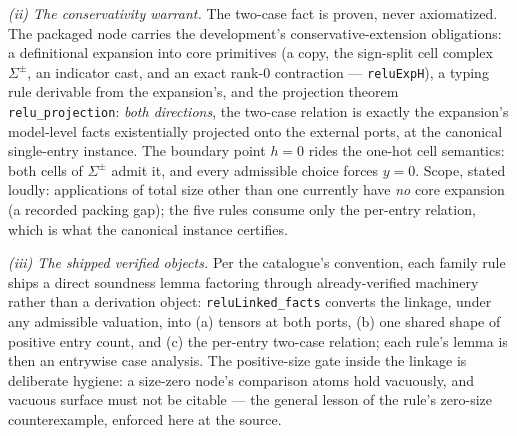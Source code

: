 \begin{brecipe}
\emph{(ii) The conservativity warrant.} The two-case fact is proven,
never axiomatized. The packaged node carries the development's
conservative-extension obligations: a definitional expansion into core
primitives (a copy, the sign-split cell complex $\Sigma^{\pm}$, an
indicator cast, and an exact rank-0 contraction ---
\texttt{reluExpH}), a typing rule derivable from the expansion's, and
the projection theorem \texttt{relu\_projection}: \emph{both
directions}, the two-case relation is exactly the expansion's
model-level facts existentially projected onto the external ports, at
the canonical single-entry instance. The boundary point $h = 0$ rides
the one-hot cell semantics: both cells of $\Sigma^{\pm}$ admit it, and
every admissible choice forces $y = 0$. Scope, stated loudly:
applications of total size other than one currently have \emph{no}
core expansion (a recorded packing gap); the five rules consume only
the per-entry relation, which is what the canonical instance
certifies.

\emph{(iii) The shipped verified objects.} Per the catalogue's
convention, each family rule ships a direct soundness lemma factoring
through already-verified machinery rather than a derivation object:
\texttt{reluLinked\_facts} converts the linkage, under any admissible
valuation, into (a) tensors at both ports, (b) one shared shape of
positive entry count, and (c) the per-entry two-case relation; each
rule's lemma is then an entrywise case analysis. The positive-size
gate inside the linkage is deliberate hygiene: a size-zero node's
comparison atoms hold vacuously, and vacuous surface must not be
citable --- the general lesson of the  rule's
zero-size counterexample, enforced here at the source.
\end{brecipe}

